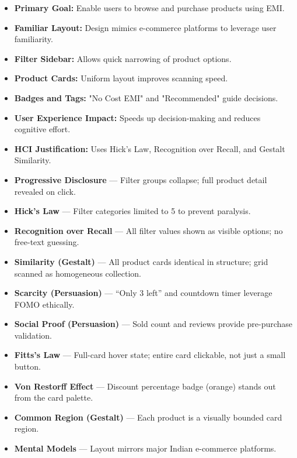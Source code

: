 \documentclass[11pt,a4paper]{article}
\newcommand{\ptag}[1]{\colorbox{tagbg}{\textcolor{tagtxt}{\textbf{\small #1}}}}
\begin{document}
\begin{itemize}[leftmargin=1.5em,itemsep=4pt]

\item \textbf{Primary Goal:}
Enable users to browse and purchase products using EMI.

\item \textbf{Familiar Layout:}
Design mimics e-commerce platforms to leverage user familiarity.

\item \textbf{Filter Sidebar:}
Allows quick narrowing of product options.

\item \textbf{Product Cards:}
Uniform layout improves scanning speed.

\item \textbf{Badges and Tags:}
"No Cost EMI" and "Recommended" guide decisions.

\item \textbf{User Experience Impact:}
Speeds up decision-making and reduces cognitive effort.

\item \textbf{HCI Justification:}
Uses Hick’s Law, Recognition over Recall, and Gestalt Similarity.

\end{itemize}

\begin{hcimap}
\begin{itemize}[leftmargin=1.2em,itemsep=2pt]
  \item \ptag{Progressive Disclosure} --- Filter groups collapse; full product detail revealed on click.
  \item \ptag{Hick's Law} --- Filter categories limited to 5 to prevent paralysis.
  \item \ptag{Recognition over Recall} --- All filter values shown as visible options; no free-text guessing.
  \item \ptag{Similarity (Gestalt)} --- All product cards identical in structure; grid scanned as homogeneous collection.
  \item \ptag{Scarcity (Persuasion)} --- ``Only 3 left'' and countdown timer leverage FOMO ethically.
  \item \ptag{Social Proof (Persuasion)} --- Sold count and reviews provide pre-purchase validation.
  \item \ptag{Fitts's Law} --- Full-card hover state; entire card clickable, not just a small button.
  \item \ptag{Von Restorff Effect} --- Discount percentage badge (orange) stands out from the card palette.
  \item \ptag{Common Region (Gestalt)} --- Each product is a visually bounded card region.
  \item \ptag{Mental Models} --- Layout mirrors major Indian e-commerce platforms.
\end{itemize}
\end{hcimap}
\end{document}
